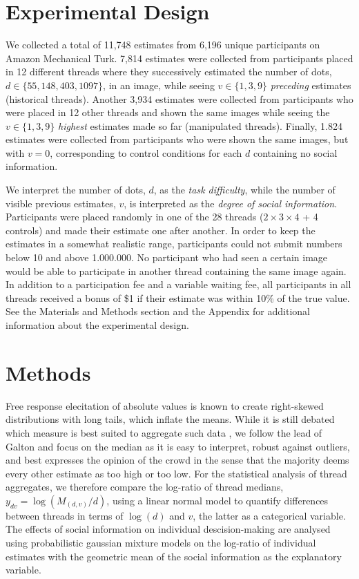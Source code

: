 \documentclass[9pt,twocolumn,twoside,lineno]{pnas-new}
\begin{document}
\section*{Experimental Design}
We collected a total of 11,748 estimates from 6,196 unique participants on Amazon Mechanical Turk. 7,814 estimates were collected from participants placed in 12 different threads where they successively estimated the number of dots, $d \in \{55,148,403,1097\}$, in an image, while seeing $v \in \{1,3,9\}$ \textit{preceding} estimates (historical threads). Another 3,934 estimates were collected from participants who were placed in 12 other threads and shown the same images while seeing the $v \in \{1,3,9\}$ \textit{highest} estimates made so far (manipulated threads). Finally, 1.824 estimates were collected from participants who were shown the same images, but with $v=0$, corresponding to control conditions for each $d$ containing no social information. 

We interpret the number of dots, $d$, as the \textit{task difficulty}, while the number of visible previous estimates, $v$, is interpreted as the \textit{degree of social information}. Participants were placed randomly in one of the 28 threads ($2 \times 3 \times 4$ + 4 controls)  and made their estimate one after another. In order to keep the estimates in a somewhat realistic range, participants could not submit numbers below 10 and above 1.000.000. No participant who had seen a certain image would be able to participate in another thread containing the same image again. In addition to a participation fee and a variable waiting fee, all participants in all threads received a bonus of \$1 if their estimate was within 10\% of the true value. See the Materials and Methods section and the Appendix for additional information about the experimental design.

\section*{Methods}
Free response elecitation of absolute values is known to create right-skewed distributions with long tails, which inflate the means. While it is still debated which measure is best suited to aggregate such data \cite{kao2018counteracting}, we follow the lead of Galton \cite{galton1907vox} and focus on the median as it is easy to interpret, robust against outliers, and best expresses the opinion of the crowd in the sense that the majority deems every other estimate as too high or too low. For the statistical analysis of thread aggregates, we therefore compare the log-ratio of thread medians, $y_{dv}=\log(M_{(d,v)}/d)$, using a linear normal model to quantify differences between threads in terms of $\log(d)$ and $v$, the latter as a categorical variable. The effects of social information on individual descision-making are analysed using probabilistic gaussian mixture models on the log-ratio of individual estimates with the geometric mean of the social information as the explanatory variable. 
\end{document}
